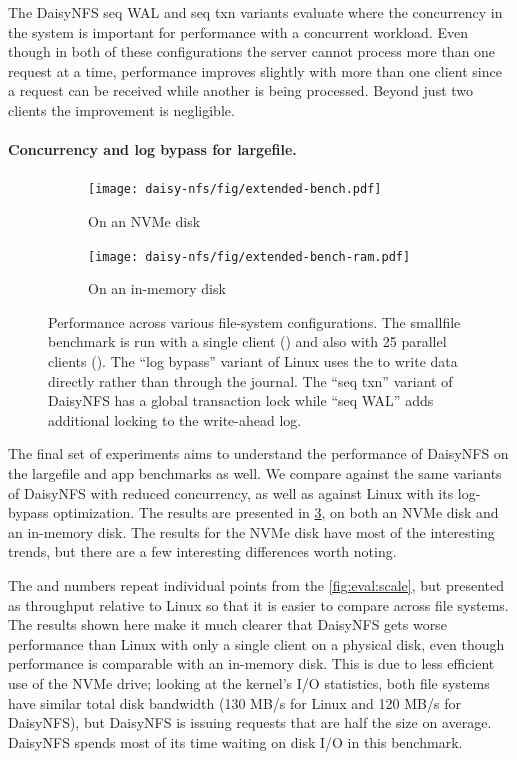 The DaisyNFS seq WAL and seq txn variants evaluate where the concurrency in the
system is important for performance with a concurrent workload. Even though in
both of these configurations the server cannot process more than one request at
a time, performance improves slightly with more than one client since a request
can be received while another is being processed. Beyond just two clients the
improvement is negligible.

\paragraph{Concurrency and log bypass for largefile.}

\begin{figure}[hp]
  \begin{subfigure}[b]{\textwidth}
    \texttt{[image: daisy-nfs/fig/extended-bench.pdf]}
    \caption{On an NVMe disk}
    \label{fig:bench-configs:nvme}
  \end{subfigure}

  \begin{subfigure}[b]{\textwidth}
    \texttt{[image: daisy-nfs/fig/extended-bench-ram.pdf]}
    \caption{On an in-memory disk}
    \label{fig:bench-configs:ram}
  \end{subfigure}
  \vspace{0.5\baselineskip}
  \caption[Benchmarks across file-system configurations]%
  {Performance across various file-system configurations. The smallfile
    benchmark is run with a single client () and also with 25
    parallel clients (). The ``log bypass'' variant of Linux
    uses the  to write data directly rather than through the
    journal. The ``seq txn'' variant of DaisyNFS has a global transaction lock
    while ``seq WAL'' adds additional locking to the write-ahead log.}
  \label{fig:bench-configs}
\end{figure}

The final set of experiments aims to understand the performance of DaisyNFS on
the largefile and app benchmarks as well. We compare against the same variants
of DaisyNFS with reduced concurrency, as well as against Linux with its
log-bypass optimization. The results are presented in \cref{fig:bench-configs},
on both an NVMe disk and an in-memory disk. The results for the NVMe disk have
most of the interesting trends, but there are a few interesting differences
worth noting.

The  and  numbers repeat individual points from
the \cref{fig:eval:scale}, but presented as throughput relative to Linux so that
it is easier to compare across file systems. The  results shown
here make it much clearer that DaisyNFS gets worse performance than Linux with
only a single client on a physical disk, even though performance is comparable with an in-memory disk. This is due to less efficient use of
the NVMe drive; looking at the kernel's I/O statistics, both file systems have
similar total disk bandwidth (130 MB/s for Linux and 120 MB/s for DaisyNFS), but
DaisyNFS is issuing requests that are half the size on average. DaisyNFS spends
most of its time waiting on disk I/O in this benchmark.

